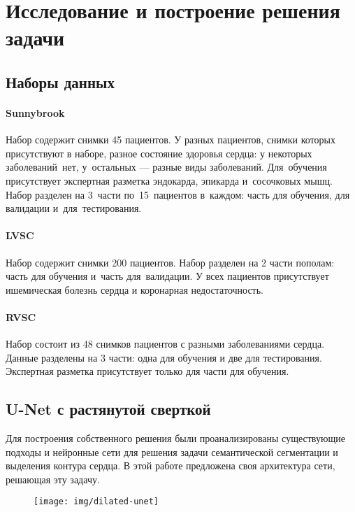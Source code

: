 \section{Исследование и построение решения задачи}

\subsection{Наборы данных}

\paragraph{Sunnybrook}

Набор содержит снимки 45 пациентов. У разных пациентов, 
снимки которых присутствуют в наборе, разное состояние здоровья сердца: 
у некоторых заболеваний~нет, у~остальных — разные виды заболеваний. 
Для~обучения присутствует экспертная разметка эндокарда, эпикарда 
и~сосочковых мышц. Набор разделен на 3~части по~15~пациентов 
в~каждом: часть для обучения, для валидации и~для~тестирования.

\paragraph{LVSC}

Набор содержит снимки 200 пациентов. Набор разделен на 2 части пополам: часть для обучения и~часть для~валидации. У всех пациентов присутствует ишемическая болезнь сердца и коронарная недостаточность.

\paragraph{RVSC}

Набор состоит из 48 снимков пациентов с разными заболеваниями сердца. Данные разделены на 3 части: одна для обучения и две для тестирования. Экспертная разметка присутствует только для части для обучения.

\subsection{U-Net с растянутой сверткой}

Для построения собственного решения были проанализированы существующие подходы и нейронные сети для решения задачи семантической сегментации и выделения контура сердца. В этой работе предложена своя архитектура сети, решающая эту задачу.

\begin{figure}[ht]
  \texttt{[image: img/dilated-unet]}
\end{figure}

